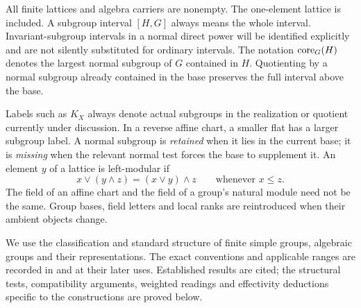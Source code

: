 All finite lattices and algebra carriers are nonempty.  The one-element
lattice is included.  A subgroup interval \([H,G]\) always means the
whole interval.  Invariant-subgroup intervals in a normal direct power
will be identified explicitly and are not silently substituted for
ordinary intervals.  The notation \(\operatorname{core}_G(H)\) denotes the largest
normal subgroup of \(G\) contained in \(H\).
Quotienting by a normal subgroup already contained in the base preserves
the full interval above the base.

Labels such as \(K_X\) always denote actual subgroups in the realization
or quotient currently under discussion.  In a reverse affine chart,
a smaller flat has a larger subgroup label.
A normal subgroup is \emph{retained} when it lies in the current base;
it is \emph{missing} when the relevant normal test forces the base
to supplement it.  An element \(y\) of a lattice is left-modular if
\[
 x\vee(y\wedge z)=(x\vee y)\wedge z
 \qquad\text{whenever }x\leq z.
\]
The field of an affine chart and the field of a group's natural module
need not be the same.  Group bases, field letters and local ranks are
reintroduced when their ambient objects change.

We use the classification and standard structure of finite simple
groups, algebraic groups and their representations.  The exact
conventions and applicable ranges are recorded in
 and at their later uses.
Established results are cited; the structural tests, compatibility
arguments, weighted readings and effectivity deductions specific to
the constructions are proved below.
\FloatBarrier

